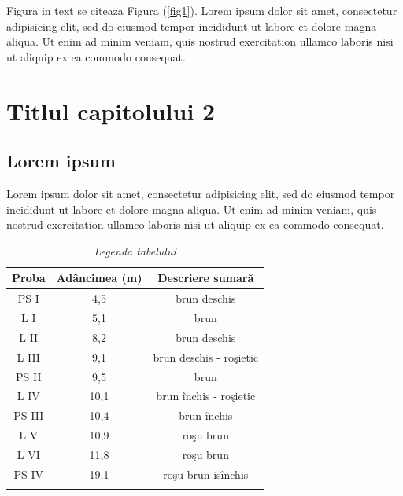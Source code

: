 \documentclass[12pt,openright,twoside]{book}
\begin{document}
Figura in text se citeaza Figura (\ref{fig1}). Lorem ipsum dolor sit amet, consectetur adipisicing elit, sed do eiusmod tempor incididunt ut labore et dolore magna aliqua. Ut enim ad minim veniam, quis nostrud exercitation ullamco laboris nisi ut aliquip ex ea commodo consequat.\\


\chapter{Titlul capitolului 2}

\section{Lorem ipsum}

Lorem ipsum dolor sit amet, consectetur adipisicing elit, sed do eiusmod tempor incididunt ut labore et dolore magna aliqua. Ut enim ad minim veniam, quis nostrud exercitation ullamco laboris nisi ut aliquip ex ea commodo consequat. \\


\begin{table}[b]
\centering
\begin{small}
{\caption{\textit{Legenda tabelului}}}
\begin{tabular}{ccc}
\hline\hline
Proba & Ad\^ancimea (m) & Descriere sumar\u{a}      \\
\hline
PS I        & 4,5              & brun deschis   \\
L I         & 5,1              & brun           \\
L II        & 8,2              & brun deschis   \\
L III       & 9,1              & brun deschis  -  ro\c{s}ietic  \\
PS II           & 9,5              & brun         \\
L IV        & 10,1             & brun \^inchis - ro\c{s}ietic   \\
PS III      & 10,4             & brun \^inchis  \\
L V         & 10,9             & ro\c{s}u brun  \\
L VI        & 11,8             & ro\c{s}u brun  \\
PS IV       & 19,1             & ro\c{s}u brun  is\^inchis          \\
\hline \label{tb1}
\end{tabular}
\end{small}
\end{table}
\end{document}
